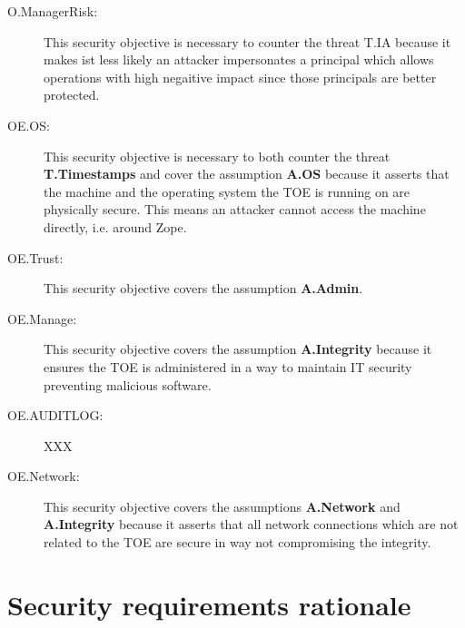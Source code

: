 \documentclass[12pt,english]{scrbook}
\begin{document}
\begin{description}
  \item[O.ManagerRisk:] This security objective is necessary to counter the
  threat T.IA because it makes ist less likely an attacker impersonates a
  principal which allows operations with high negaitive impact since those
  principals are better protected.

  \item[OE.OS:] This security objective is necessary to both counter the
  threat \textbf{T.Timestamps} and cover the assumption \textbf{A.OS} because
  it asserts that the machine and the operating system the TOE is running on
  are physically secure. This means an attacker cannot access the machine
  directly, i.e. around Zope.

  \item[OE.Trust:] This security objective covers the assumption
  \textbf{A.Admin}.
  
  \item[OE.Manage:] This security objective covers the assumption
  \textbf{A.Integrity} because it ensures the TOE is administered in a way to
  maintain IT security preventing malicious software.

  \item[OE.AUDITLOG:] XXX

  \item[OE.Network:] This security objective covers the assumptions
  \textbf{A.Network} and \textbf{A.Integrity} because it asserts that all
  network connections which are not related to the TOE are secure in way not
  compromising the integrity.
  
\end{description}



\section{Security requirements rationale}
\end{document}
